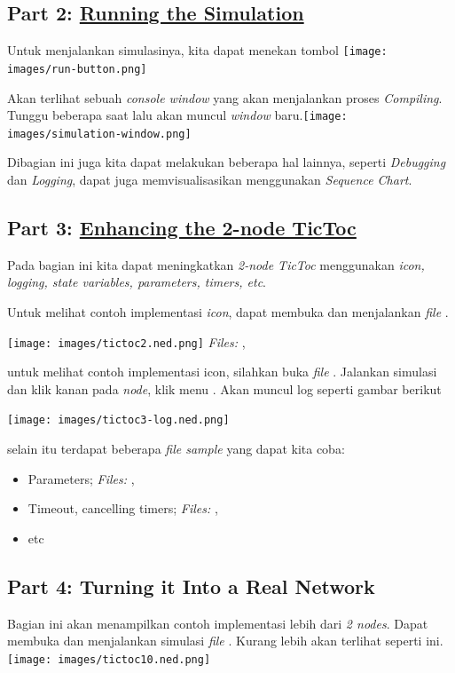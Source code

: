 \documentclass[conference]{IEEEtran}
\begin{document}
\subsection{Part 2: \href{https://docs.omnetpp.org/tutorials/tictoc/part2/}{Running the Simulation}}
Untuk menjalankan simulasinya, kita dapat menekan tombol \break
\texttt{[image: images/run-button.png]}

Akan terlihat sebuah \textit{console window} yang akan menjalankan proses \textit{Compiling}. Tunggu beberapa saat lalu akan muncul \textit{window} baru.\break \texttt{[image: images/simulation-window.png]}

Dibagian ini juga kita dapat melakukan beberapa hal lainnya, seperti \textit{Debugging} dan \textit{Logging}, dapat juga memvisualisasikan menggunakan \textit{Sequence Chart}.

\subsection{Part 3: \href{https://docs.omnetpp.org/tutorials/tictoc/part3/}{Enhancing the 2-node TicToc}}
Pada bagian ini kita dapat meningkatkan \textit{2-node TicToc} menggunakan \textit{icon, logging, state variables, parameters, timers, etc}.

Untuk melihat contoh implementasi \textit{icon}, dapat membuka  dan menjalankan \textit{file} .\break

\texttt{[image: images/tictoc2.ned.png]}
\textit{Files:} , 


untuk melihat contoh implementasi icon, silahkan buka \textit{file} . Jalankan simulasi dan klik kanan pada \textit{node}, klik menu . Akan muncul log seperti gambar berikut

\texttt{[image: images/tictoc3-log.ned.png]}


selain itu terdapat beberapa \textit{file sample} yang dapat kita coba:
\begin{itemize}
	\item Parameters; \textit{Files: }, 
	\item Timeout, cancelling timers; \textit{Files: }, 
	\item etc
\end{itemize}

\subsection{Part 4: Turning it Into a Real Network}
Bagian ini akan menampilkan contoh implementasi lebih dari \textit{2 nodes}. Dapat membuka dan menjalankan simulasi \textit{file}  . Kurang lebih akan terlihat seperti ini.
\texttt{[image: images/tictoc10.ned.png]}
\end{document}
